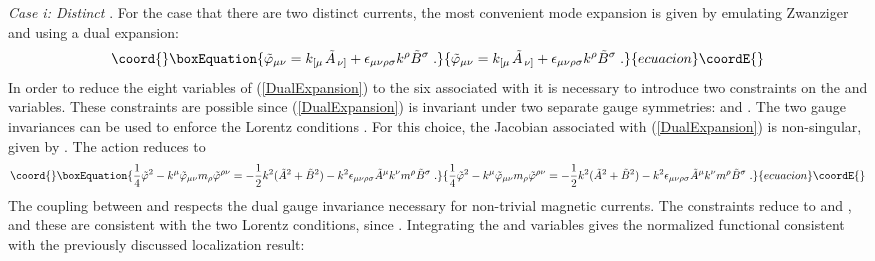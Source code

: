 \documentclass[a4paper,a4paper]{article}
\begin{document}
{\it Case i: Distinct \coordHE{}}.  For the case that there are two distinct currents, the most convenient mode expansion is given by emulating Zwanziger and using a dual expansion:
\begin{equation}\coord{}\boxEquation{
\label{DualExpansion}
\tilde{\varphi}_{\mu \nu} = k_{\left[ \mu \right.} \tilde{A}_{\left. \nu \right]} +  \epsilon_{\mu \nu \rho \sigma} k^\rho \tilde{B}^\sigma \; .
}{
\tilde{\varphi}_{\mu \nu} = k_{\left[ \mu \right.} \tilde{A}_{\left. \nu \right]} +  \epsilon_{\mu \nu \rho \sigma} k^\rho \tilde{B}^\sigma \; .
}{ecuacion}\coordE{}\end{equation}
In order to reduce the eight variables of (\ref{DualExpansion}) to the six associated with \myHighlight{$\tilde{\varphi}$}\coordHE{} it is necessary to introduce two constraints on the \coordHE{} and \coordHE{} variables.  These constraints are possible since (\ref{DualExpansion}) is invariant under two separate gauge symmetries: \coordHE{} and  \coordHE{}.  The two gauge invariances can be used to enforce the Lorentz conditions \coordHE{}.  For this choice, the Jacobian associated with (\ref{DualExpansion}) is non-singular, given by \coordHE{}.  The action reduces to
\begin{equation}\coord{}\boxEquation{
\label{DualAction}
\frac{1}{4} \tilde{\varphi}^2 - k^\mu \tilde{\varphi}_{\mu \nu} m_\rho \tilde{\varphi}^{ \rho \nu}  = - \frac{1}{2} k^2 ( \tilde{A}^2 + \tilde{B}^2 ) -  k^2 \epsilon_{\mu \nu \rho \sigma} \tilde{A}^\mu k^\nu m^\rho \tilde{B}^\sigma \; .
}{
\frac{1}{4} \tilde{\varphi}^2 - k^\mu \tilde{\varphi}_{\mu \nu} m_\rho \tilde{\varphi}^{ \rho \nu}  = - \frac{1}{2} k^2 ( \tilde{A}^2 + \tilde{B}^2 ) -  k^2 \epsilon_{\mu \nu \rho \sigma} \tilde{A}^\mu k^\nu m^\rho \tilde{B}^\sigma \; .
}{ecuacion}\coordE{}\end{equation}
The coupling between \coordHE{} and \coordHE{} respects the dual gauge invariance necessary for non-trivial magnetic currents.  The constraints reduce to \coordHE{} and \coordHE{}, and these are consistent with the two Lorentz conditions, since \coordHE{}. Integrating the \coordHE{} and \coordHE{} variables gives the normalized functional consistent with the previously discussed localization result:
\end{document}

